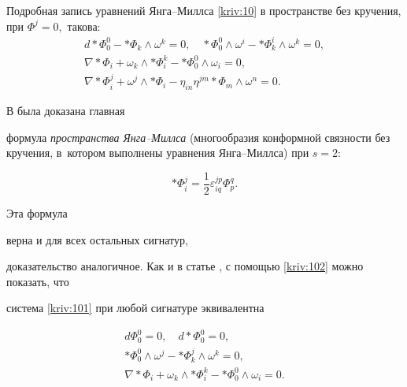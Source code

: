 Подробная запись уравнений Янга--Мил\-л\-са \eqref{kriv:10} в пространстве без кручения, при $\Phi ^{j}=0,$ такова:\begin{equation}

\begin{array}{c}

d\ast \Phi _{0}^{0}-\ast \Phi _{k}\wedge \omega ^{k}=0,\quad 

\ast \Phi

_{0}^{0}\wedge \omega ^{i}-\ast \Phi _{k}^{i}\wedge \omega ^{k}=0, \\ 

\nabla \ast \Phi _{i}+\omega _{k}\wedge \ast \Phi _{i}^{k}-\ast \Phi

_{0}^{0}\wedge \omega _{i}=0, \\ 

\nabla \ast \Phi _{i}^{j}+\omega ^{j}\wedge \ast \Phi _{i}-\eta _{in}\eta

^{jm}\ast \Phi _{m}\wedge \omega ^{n}=0.\end{array}

\label{kriv:101}

\end{equation}

В \cite{bib:kriv:2} была доказана главная 

формула \textit{пространства  Янга--Миллса} (многообразия конформной связности  без кручения,  в~котором выполнены уравнения Янга--Миллса) при $s=2$:

\begin{equation}

\ast \Phi _{i}^{j}=\frac{1}{2}\varepsilon _{iq}^{jp}\Phi _{p}^{q}.

\label{kriv:102}

\end{equation}

Эта формула 

верна и для всех остальных сигнатур,

доказательство аналогичное. Как и в статье \cite{bib:kriv:2}, с помощью \eqref{kriv:102} можно показать,  что 

система \eqref{kriv:101} при любой сигнатуре эквивалентна

\begin{gather}

d\Phi _{0}^{0}=0,\quad d\ast \Phi _{0}^{0}=0,  \label{kriv:103} \\

\ast \Phi _{0}^{0}\wedge \omega ^{j}-\ast \Phi _{k}^{j}\wedge \omega ^{k}=0,

\label{kriv:104} \\

\nabla \ast \Phi _{i}+\omega _{k}\wedge \ast \Phi _{i}^{k}-\ast \Phi

_{0}^{0}\wedge \omega _{i}=0.  \label{kriv:105}

\end{gather}



